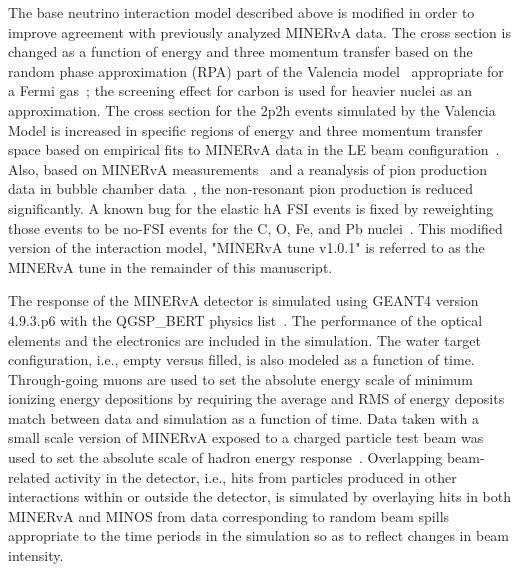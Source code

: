 \documentclass[aps,prd,twocolumn,showpacs,superscriptaddress,floatfix]{revtex4-2}  %
\begin{document}
The base neutrino interaction model described above is modified in order to improve agreement with previously analyzed MINERvA data. The cross section is changed as a function of energy and three momentum transfer based on the random phase approximation (RPA) part
of the Valencia model~\cite{Nieves:2004wx}\cite{Gran1705} appropriate for a Fermi gas~\cite{Martini:2009uj,*Nieves:2017lij}; the screening effect for carbon is used for heavier nuclei as an approximation. 
The cross section for the 2p2h events simulated by the Valencia Model is increased in specific regions of energy and three momentum transfer space based on empirical fits to MINERvA data in the LE beam configuration~\cite{MINERvA:2015ydy}. Also, based on MINERvA measurements~\cite{MINERvA:2014ogb, *MINERvA:2014ani} and a reanalysis of pion production data in bubble chamber data~\cite{Wilkinson:2014yfa}, the non-resonant pion production is reduced significantly.  A known bug for the elastic hA FSI events is fixed by reweighting those events to be no-FSI events  for the C, O, Fe, and Pb nuclei~\cite{Harewood:2019rzy}. This modified version of the interaction model, "MINERvA tune v1.0.1"  is referred to as the MINERvA tune in the remainder of this manuscript.

The response of the MINERvA detector is simulated using GEANT4 version 4.9.3.p6 with the QGSP{\_}BERT physics list~\cite{Kaidalov:1982xg}.  The performance of the optical elements and the electronics are included in the simulation. The water target configuration, i.e., empty versus filled, is also modeled as a function of time.  Through-going muons are used to set the absolute energy scale of minimum ionizing energy depositions by requiring the average and RMS of energy deposits match between data and simulation as a function of time. Data taken with a small scale version of MINERvA exposed to a charged particle test beam was used to set the absolute scale of hadron energy response~\cite{MINERvA:2015yej}.  Overlapping beam-related activity in the detector, i.e., hits from particles produced in other interactions within or outside the detector, is simulated by overlaying hits in both MINERvA and MINOS from data corresponding to random beam spills appropriate to the time periods in the simulation so as to reflect changes in beam intensity.
\end{document}
